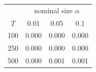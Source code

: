 % 
\begin{tabular}{cccc}
  \hline
  & \multicolumn{3}{c}{nominal size $\alpha$} \\
 $T$ & 0.01 & 0.05 & 0.1 \\
 \hline
100 & 0.000 & 0.000 & 0.000 \\ 
  250 & 0.000 & 0.000 & 0.000 \\ 
  500 & 0.000 & 0.001 & 0.001 \\ 
   \hline
\end{tabular}
